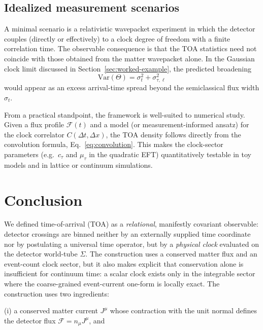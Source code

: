 \documentclass[11pt, a4paper]{article}
\theoremstyle{definition}
\theoremstyle{plain}
\theoremstyle{remark}
\numberwithin{equation}{section}
\begin{document}
    \subsection*{Idealized measurement scenarios}
    
    A minimal scenario is a relativistic wavepacket experiment in which the detector couples (directly or effectively) to a clock degree of freedom with a finite correlation time. The observable consequence is that the TOA statistics need not coincide with those obtained from the matter wavepacket alone. In the Gaussian clock limit discussed in Section~\ref{sec:worked-example}, the predicted broadening
    \begin{equation}
        \mathrm{Var}(\Theta)=\sigma_t^2+\sigma_{\tau,\ell}^2
    \end{equation}
    would appear as an excess arrival-time spread beyond the semiclassical flux width $\sigma_t$.
    
    From a practical standpoint, the framework is well-suited to numerical study. Given a flux profile $\mathcal{F}(t)$ and a model (or measurement-informed ansatz) for the clock correlator $C(\Delta t,\Delta x)$, the TOA density follows directly from the convolution formula, Eq.~\eqref{eq:convolution}. This makes the clock-sector parameters (e.g.\ $c_\tau$ and $\mu_\tau$ in the quadratic EFT) quantitatively testable in toy models and in lattice or continuum simulations.

    \section{Conclusion}
    
    We defined time-of-arrival (TOA) as a \emph{relational}, manifestly covariant observable: detector crossings are binned neither by an externally supplied time coordinate nor by postulating a universal time operator, but by a \emph{physical clock} evaluated on the detector world-tube $\Sigma$. The construction uses a conserved matter flux and an event-count clock sector, but it also makes explicit that conservation alone is insufficient for continuum time: a scalar clock exists only in the integrable sector where the coarse-grained event-current one-form is locally exact. The construction uses two ingredients:
    
    \smallskip
    \noindent
    (i) a conserved matter current $J^\mu$ whose contraction with the unit normal defines the detector flux $\mathcal{F}=n_\mu J^\mu$, and
    
\end{document}

